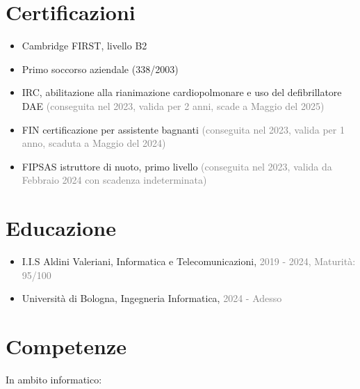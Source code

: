 \documentclass{paper}
\begin{document}
\section{Certificazioni}

\begin{itemize}
    \item Cambridge FIRST, livello B2

    \item Primo soccorso aziendale (338/2003)

    \item IRC, abilitazione alla rianimazione cardiopolmonare e uso del defibrillatore DAE \textcolor{gray}{(conseguita nel 2023, valida per 2 anni, scade a Maggio del 2025)}

    \item FIN certificazione per assistente bagnanti \textcolor{gray}{(conseguita nel 2023, valida per 1 anno, scaduta a Maggio del 2024)}

    \item FIPSAS istruttore di nuoto, primo livello \textcolor{gray}{(conseguita nel 2023, valida da Febbraio 2024 con scadenza indeterminata)}
\end{itemize}

\section{Educazione}

\begin{itemize}
    \item I.I.S Aldini Valeriani, Informatica e Telecomunicazioni, \textcolor{gray}{2019 - 2024, Maturità: 95/100}

    \item Università di Bologna, Ingegneria Informatica, \textcolor{gray}{2024 - Adesso}
\end{itemize}

\section{Competenze}

In ambito informatico:
\end{document}
